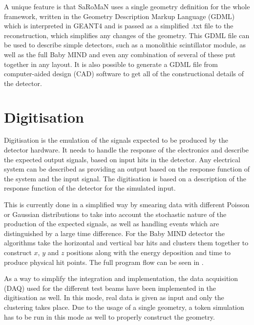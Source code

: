 
A unique feature is that SaRoMaN uses a single geometry definition for the whole framework, written in the Geometry Description Markup Language (GDML)~\cite{GDML} which is interpreted in GEANT4 and is passed as a simplified .txt file to the reconstruction, which simplifies any changes of the geometry. This GDML file can be used to describe simple detectors, such as a monolithic scintillator module, as well as the full Baby MIND and even any combination of several of these put together in any layout. It is also possible to generate a GDML file from computer-aided design (CAD) software to get all of the constructional details of the detector.

\section{Digitisation}
Digitisation is the emulation of the signals expected to be produced by the detector hardware. It needs to handle the response of the electronics and describe the expected output signals, based on input hits in the detector. Any electrical system can be described as providing an output based on the response function of the system and the input signal. The digitisation is based on a description of the response function of the detector for the simulated input.

This is currently done in a simplified way by smearing data with different Poisson or Gaussian distributions to take into account the stochastic nature of the production of the expected signals, as well as handling events which are distinguished by a large time difference. For the Baby MIND detector the algorithms take the horizontal and vertical bar hits and clusters them together to construct $x$, $y$ and $z$ positions along with the energy deposition and time to produce physical hit points. The full program flow can be seen in .

As a way to simplify the integration and implementation, the data acquisition (DAQ) used for the different test beams have been implemented in the digitisation as well. In this mode, real data is given as input and only the clustering takes place. Due to the usage of a single geometry, a token simulation has to be run in this mode as well to properly construct the geometry.


